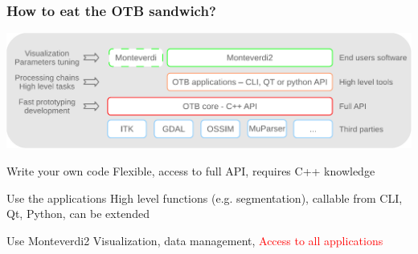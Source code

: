 \documentclass[8pt]{beamer}
\begin{document}
\begin{frame}
\frametitle{How to eat the OTB sandwich?}
\vspace{-0.5cm}
\begin{center}
\includegraphics[width=\textwidth]{images/sandwich.pdf}
\end{center}
\vspace{-0.5cm}
\begin{block}{Write your own code}
 Flexible, access to full API, requires C++ knowledge
\end{block}
\begin{block}{Use the applications}
 High level functions (e.g. segmentation), callable from CLI, Qt, Python, can be extended
\end{block}
\begin{block}{Use Monteverdi2}
Visualization, data management, \textcolor{red}{Access to all applications}
\end{block}
\end{frame}
\end{document}
